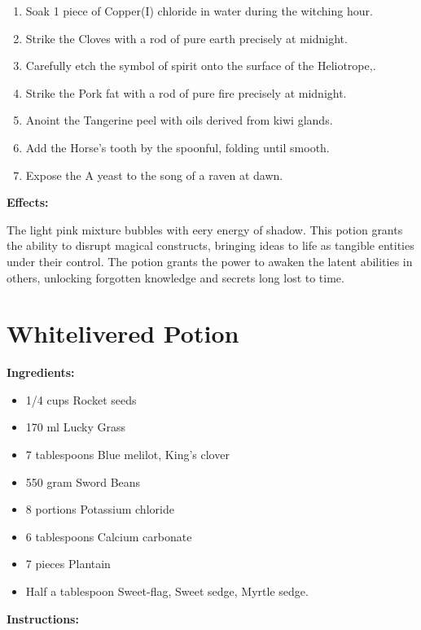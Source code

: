 \documentclass{article}
\begin{document}
\begin{enumerate}
  \item Soak 1 piece of Copper(I) chloride in water during the witching hour.
  \item Strike the Cloves with a rod of pure earth precisely at midnight.
  \item Carefully etch the symbol of spirit onto the surface of the Heliotrope,.
  \item Strike the Pork fat with a rod of pure fire precisely at midnight.
  \item Anoint the Tangerine peel with oils derived from kiwi glands.
  \item Add the Horse's tooth by the spoonful, folding until smooth.
  \item Expose the A yeast to the song of a raven at dawn.
\end{enumerate}

\textbf{Effects:}

The light pink mixture bubbles with eery energy of shadow. This potion grants the ability to disrupt magical constructs, bringing ideas to life as tangible entities under their control. The potion grants the power to awaken the latent abilities in others, unlocking forgotten knowledge and secrets long lost to time.

\newpage
\section*{Whitelivered Potion}

\textbf{Ingredients:}

\begin{itemize}
  \item 1/4 cups Rocket seeds
  \item 170 ml Lucky Grass
  \item 7 tablespoons Blue melilot, King's clover
  \item 550 gram Sword Beans
  \item 8 portions Potassium chloride
  \item 6 tablespoons Calcium carbonate
  \item 7 pieces Plantain
  \item Half a tablespoon Sweet-flag, Sweet sedge, Myrtle sedge.
\end{itemize}

\textbf{Instructions:}
\end{document}
